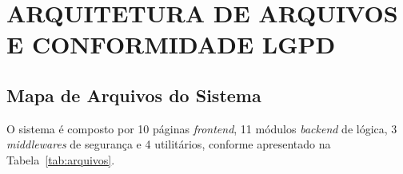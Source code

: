 \documentclass[12pt,a4paper]{article}
\begin{document}
\section{ARQUITETURA DE ARQUIVOS E CONFORMIDADE LGPD}

\subsection{Mapa de Arquivos do Sistema}

O sistema é composto por 10 páginas \textit{frontend}, 11 módulos \textit{backend} de lógica,
3 \textit{middlewares} de segurança e 4 utilitários, conforme apresentado
na Tabela~\ref{tab:arquivos}.
\end{document}
